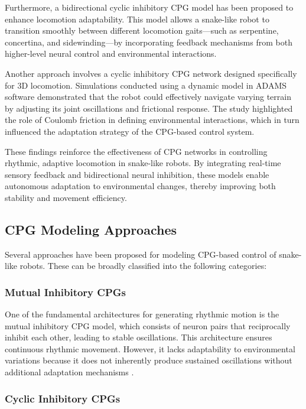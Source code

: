 \documentclass[12pt,a4paper]{report}
\begin{document}
Furthermore, a bidirectional cyclic inhibitory CPG model has been proposed to enhance locomotion adaptability. This model allows a snake-like robot to transition smoothly between different locomotion gaits—such as serpentine, concertina, and sidewinding—by incorporating feedback mechanisms from both higher-level neural control and environmental interactions\textcite{Zhenli2006}. 

Another approach involves a cyclic inhibitory CPG network designed specifically for 3D locomotion. Simulations conducted using a dynamic model in ADAMS software demonstrated that the robot could effectively navigate varying terrain by adjusting its joint oscillations and frictional response. The study highlighted the role of Coulomb friction in defining environmental interactions, which in turn influenced the adaptation strategy of the CPG-based control system\textcite{Lu2006}. 

These findings reinforce the effectiveness of CPG networks in controlling rhythmic, adaptive locomotion in snake-like robots. By integrating real-time sensory feedback and bidirectional neural inhibition, these models enable autonomous adaptation to environmental changes, thereby improving both stability and movement efficiency.

\subsection{CPG Modeling Approaches}

Several approaches have been proposed for modeling CPG-based control of snake-like robots. These can be broadly classified into the following categories:

\subsubsection{Mutual Inhibitory CPGs}

One of the fundamental architectures for generating rhythmic motion is the mutual inhibitory CPG model, which consists of neuron pairs that reciprocally inhibit each other, leading to stable oscillations. This architecture ensures continuous rhythmic movement. However, it lacks adaptability to environmental variations because it does not inherently produce sustained oscillations without additional adaptation mechanisms \textcite{Lu2006}.

\subsubsection{Cyclic Inhibitory CPGs}
\end{document}
